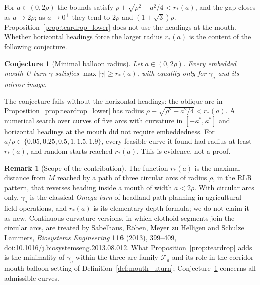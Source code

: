 \documentclass[11pt,reqno]{amsart}
\newtheorem{conjecture}[theorem]{Conjecture}
\theoremstyle{definition}
\newtheorem{remark}[theorem]{Remark}
\numberwithin{equation}{section}
\begin{document}
For $a\in(0,2\rho)$ the bounds satisfy $\rho+\sqrt{\rho^2-a^2/4}<r_*(a)$, and the gap closes as $a\to2\rho$; as $a\to0^+$ they tend to $2\rho$ and $(1+\sqrt3)\rho$. Proposition~\ref{prop:teardrop_lower} does not use the headings at the mouth. Whether horizontal headings force the larger radius $r_*(a)$ is the content of the following conjecture.

\begin{conjecture}[Minimal balloon radius]
\label{conj:teardrop_radius}
Let $a\in(0,2\rho)$. Every embedded mouth U-turn $\gamma$ satisfies $\max|\gamma|\ge r_*(a)$, with equality only for $\gamma_a$ and its mirror image.
\end{conjecture}

The conjecture fails without the horizontal headings: the oblique arc in Proposition~\ref{prop:teardrop_lower} has radius $\rho+\sqrt{\rho^2-a^2/4}<r_*(a)$. A numerical search over curves of five arcs with curvature in $[-\kappa^*,\kappa^*]$ and horizontal headings at the mouth did not require embeddedness. For $a/\rho\in\{0.05,0.25,0.5,1,1.5,1.9\}$, every feasible curve it found had radius at least $r_*(a)$, and random starts reached $r_*(a)$. This is evidence, not a proof.

\begin{remark}[Scope of the contribution]
The function $r_*(a)$ is the maximal distance from $M$ reached by a path of three circular arcs of radius $\rho$, in the RLR pattern, that reverses heading inside a mouth of width $a<2\rho$. With circular arcs only, $\gamma_a$ is the classical \emph{Omega-turn} of headland path planning in agricultural field operations, and $r_*(a)$ is its elementary depth formula; we do not claim it as new. Continuous-curvature versions, in which clothoid segments join the circular arcs, are treated by Sabelhaus, R\"oben, Meyer zu Helligen and Schulze Lammers, \emph{Biosystems Engineering} \textbf{116} (2013), 399--409, doi:10.1016/j.biosystemseng.2013.08.012. What Proposition~\ref{prop:teardrop} adds is the minimality of $\gamma_a$ within the three-arc family $\mathcal F_a$ and its role in the corridor-mouth-balloon setting of Definition~\ref{def:mouth_uturn}; Conjecture~\ref{conj:teardrop_radius} concerns all admissible curves.
\end{remark}
\end{document}
